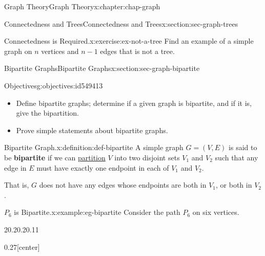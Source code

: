 \documentclass[oneside,10pt,]{book}
\newcommand{\terminology}[1]{\textbf{#1}}
\numberwithin{equation}{section}
\begin{document}
\begin{chapterptx}{Graph Theory}{}{Graph Theory}{}{}{x:chapter:chap-graph}
\begin{sectionptx}{Connectedness and Trees}{}{Connectedness and Trees}{}{}{x:section:sec-graph-trees}
\begin{inlineexercise}{Connectedness is Required.}{x:exercise:ex-not-a-tree}
Find an example of a simple graph on \(n\) vertices and \(n-1\) edges that is not a tree.%
\end{inlineexercise}%
\end{sectionptx}
%
%
\typeout{************************************************}
\typeout{************************************************}
%
\begin{sectionptx}{Bipartite Graphs}{}{Bipartite Graphs}{}{}{x:section:sec-graph-bipartite}
\begin{objectives}{Objectives}{g:objectives:id549413}
%
\begin{itemize}[label=\textbullet]
\item{}Define bipartite graphs; determine if a given graph is bipartite, and if it is, give the bipartition.%
\item{}Prove simple statements about bipartite graphs.%
\end{itemize}
\end{objectives}
\begin{definition}{Bipartite Graph.}{x:definition:def-bipartite}%
A simple graph \(G = (V,E)\) is said to be \terminology{bipartite} if we can \hyperref[x:definition:def-partition]{partition} \(V\) into two disjoint sets \(V_1\) and \(V_2\) such that any edge in \(E\) must have exactly one endpoint in each of \(V_1\) and \(V_2\).%
\par
That is, \(G\) does not have any edges whose endpoints are both in \(V_1\), or both in \(V_2\).%
\end{definition}
\begin{example}{\(P_6\) is Bipartite.}{x:example:eg-bipartite}%
Consider the path \(P_6\) on six vertices.%
\begin{sidebyside}{2}{0.2}{0.2}{0.11}%
\begin{sbspanel}{0.27}[center]%
\end{sbspanel}
\end{sidebyside}
\end{example}
\end{sectionptx}
\end{chapterptx}
\end{document}
